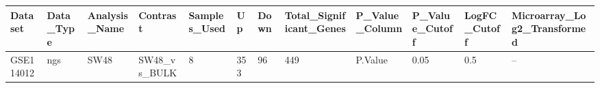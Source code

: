 \begingroup
\tiny
\setlength{\tabcolsep}{2pt}
\renewcommand{\arraystretch}{1.18}
\begin{tabular}{@{}llllllllllll@{}}
\toprule
Dataset & Data\_Type & Analysis\_Name & Contrast & Samples\_Used & Up & Down & Total\_Significant\_Genes & P\_Value\_Column & P\_Value\_Cutoff & LogFC\_Cutoff & Microarray\_Log2\_Transformed \\
\midrule
GSE114012 & ngs & SW48 & SW48\_vs\_BULK & 8 & 353 & 96 & 449 & P.Value & 0.05 & 0.5 & -- \\
\bottomrule
\end{tabular}
\endgroup

